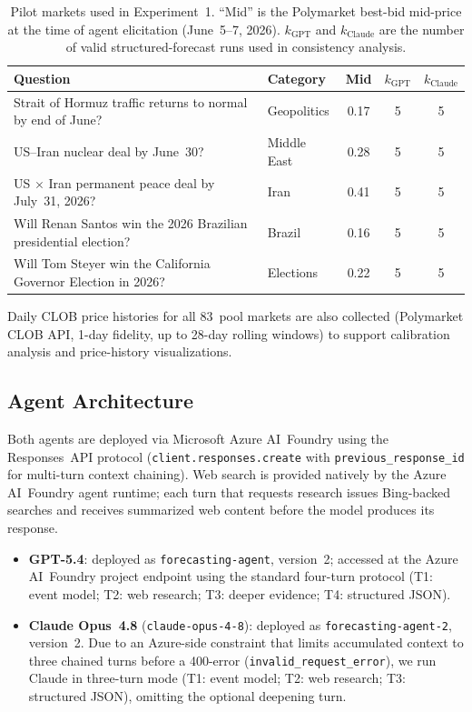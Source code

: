 \begin{table}[h]
\centering
\caption{Pilot markets used in Experiment~1.  ``Mid'' is the Polymarket best-bid mid-price
at the time of agent elicitation (June~5--7, 2026).  $k_\text{GPT}$ and $k_\text{Claude}$
are the number of valid structured-forecast runs used in consistency analysis.}
\label{tab:markets}
\small
\begin{tabular}{p{6.2cm} l c c c}
\toprule
\textbf{Question} & \textbf{Category} & \textbf{Mid} & $k_\text{GPT}$ & $k_\text{Claude}$ \\
\midrule
Strait of Hormuz traffic returns to normal by end of June? & Geopolitics & 0.17 & 5 & 5 \\
US--Iran nuclear deal by June~30?                          & Middle East & 0.28 & 5 & 5 \\
US $\times$ Iran permanent peace deal by July~31, 2026?    & Iran        & 0.41 & 5 & 5 \\
Will Renan Santos win the 2026 Brazilian presidential election? & Brazil  & 0.16 & 5 & 5 \\
Will Tom Steyer win the California Governor Election in 2026?   & Elections & 0.22 & 5 & 5 \\
\bottomrule
\end{tabular}
\end{table}

Daily CLOB price histories for all 83~pool markets are also collected (Polymarket CLOB API,
1-day fidelity, up to 28-day rolling windows) to support calibration analysis and price-history
visualizations.

\subsection{Agent Architecture}
\label{app:agent-arch}

Both agents are deployed via Microsoft Azure AI~Foundry using the Responses~API protocol
(\texttt{client.responses.create} with \texttt{previous\_response\_id} for multi-turn
context chaining).  Web search is provided natively by the Azure AI~Foundry agent runtime;
each turn that requests research issues Bing-backed searches and receives summarized web
content before the model produces its response.

\begin{itemize}
  \item \textbf{GPT-5.4}: deployed as \texttt{forecasting-agent}, version~2; accessed at
        the Azure AI~Foundry project endpoint using the standard four-turn protocol
        (T1: event model; T2: web research; T3: deeper evidence; T4: structured JSON).
  \item \textbf{Claude Opus~4.8} (\texttt{claude-opus-4-8}): deployed as
        \texttt{forecasting-agent-2}, version~2.  Due to an Azure-side constraint that
        limits accumulated context to three chained turns before a 400-error
        (\texttt{invalid\_request\_error}), we run Claude in three-turn mode
        (T1: event model; T2: web research; T3: structured JSON), omitting the optional
        deepening turn.
\end{itemize}

